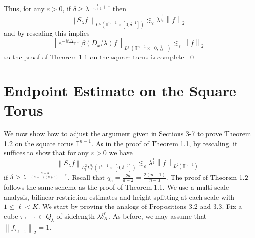 \documentclass[11pt]{amsart}
\numberwithin{equation}{section}
\newcommand{\Tn}{\mathbb{T}^{n-1}}
\newcommand{\la}{\lambda}
\newcommand\norm[1]{\left\lVert#1\right\rVert}
\newcommand{\lpnorm}[3]{\norm{#1}_{L^{#2}(#3)}}
\newcommand{\altlpnorm}[2]{\norm{#1}_{#2}}
\newcommand{\mixlpnorm}[4]{\norm{#1}_{L^{#2}_{t} L^{#3}_{x}(#4)}}
\newcommand{\laplac}[1]{\Delta_{#1}}
\newcommand{\Sl}{S_{\la}}
\newcommand{\dK}[1]{\delta_{K}^{#1}}
\begin{document}
Thus, for any $\varepsilon > 0$, if $\delta \geq \la^{-\frac{1}{n+1} + \varepsilon}$ then 
\begin{equation}
    \lpnorm{\Sl f}{q_c}{\Tn \times [0, \delta^{-1}]} \lesssim_{\varepsilon} \la^{\frac{1}{q_c}}\altlpnorm{f}{2}
\end{equation}
and by rescaling this implies
\begin{equation}
    \lpnorm{e^{-it \laplac{\Tn}}\beta(D_x/\la)f}{q_c}{\Tn \times [0, \frac{1}{\la \delta}]} \lesssim_{\varepsilon} \altlpnorm{f}{2}
\end{equation}
so the proof of Theorem 1.1 on the square torus is complete.
\qed

\section{Endpoint Estimate on the Square Torus}
We now show how to adjust the argument given in Sections 3-7 to prove Theorem 1.2 on the square torus $\Tn$. As in the proof of Theorem 1.1, by rescaling, it suffices to show that for any $\varepsilon > 0$ we have
\begin{equation}
    \mixlpnorm{\Sl f}{2}{q_e}{\Tn\times[0,\delta^{-1}]} \lesssim_{\varepsilon} \la^{\frac{1}{2}}\lpnorm{f}{2}{\Tn}
\end{equation}
if $\delta \geq \la^{-\frac{n-3}{(n-1)(n+3)}+ \varepsilon}$.
Recall that $q_e = \frac{2d}{d-2} = \frac{2(n-1)}{n-3}$. The proof of Theorem 1.2 follows the same scheme as the proof of Theorem 1.1. We use a multi-scale analysis, bilinear restriction estimates and height-splitting at each scale with $1 \leq \ell < K$. We start by proving the analogs of Propositions 3.2 and 3.3. Fix a cube $\tau_{\ell - 1} \subset Q_{\la}$ of sidelength $\la\dK{\ell}$. As before, we may assume that $\altlpnorm{f_{\tau_{\ell - 1}}}{2} = 1$.
\end{document}
